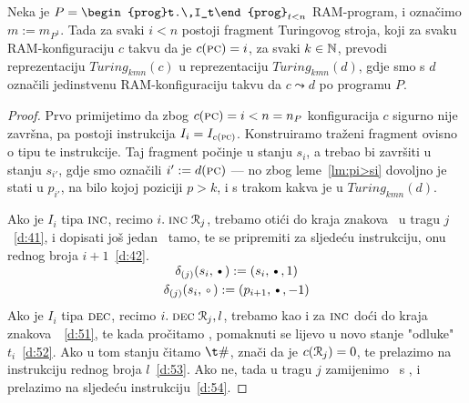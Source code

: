 \begin{propozicija}\label{prop:gadgets}
Neka je $P=\begin{prog}t.\,I_t\end{prog}_{t<n}$ RAM-program, i označimo $m:=m_{P^1}$. Tada za svaki $i<n$ postoji fragment Turingovog stroja, koji za svaku RAM-konfiguraciju $c$ takvu da je $c(\textsc{pc})=i$, za svaki $k\in{\mathbb N}$, prevodi reprezentaciju $Turing_{kmn}(c)$ u reprezentaciju $Turing_{kmn}(d)$, gdje smo s $d$ označili jedinstvenu RAM-konfiguraciju takvu da $c\leadsto d$ po programu $P$.
\end{propozicija}
\begin{proof}
Prvo primijetimo da zbog $c(\textsc{pc})=i<n=n_P$ konfiguracija $c$ sigurno nije završna, pa postoji instrukcija $I_i=I_{c(\textsc{pc})}$. Konstruiramo traženi fragment ovisno o tipu te instrukcije. Taj fragment počinje u stanju $s_i$, a trebao bi završiti u stanju $s_{i'}$, gdje smo označili $i':=d(\textsc{pc})$ --- no zbog leme~\ref{lm:pi>si} dovoljno je stati u $p_{i'}$, na bilo kojoj poziciji $p>k$, i s trakom kakva je u $Turing_{kmn}(d)$.

Ako je $I_i$ tipa $\textsc{inc}$, recimo  $i.\;\textsc{inc}\;\mathcal R_{j}$, trebamo otići do kraja znakova \textbullet\ u tragu $j$~\eqref{d:41}, i dopisati još jedan \textbullet\ tamo, te se pripremiti za sljedeću instrukciju, onu rednog broja $i+1$~\eqref{d:42}.

\noindent\begin{gather}
\SwapAboveDisplaySkip
\label{d:41}
    \delta_{(j)}(s_i,\text\textbullet):=(s_i,\text\textbullet,1)\\
\label{d:42}
    \delta_{(j)}(s_i,\text\textopenbullet):=(p_{i+1},\text\textbullet,-1)
\end{gather}
Ako je $I_i$ tipa $\textsc{dec}$, recimo $i.\;\textsc{dec}\;\mathcal R_{j},l$, trebamo kao i za $\textsc{inc}$ doći do kraja znakova~\textbullet~\eqref{d:51}, te kada pročitamo \textopenbullet, pomaknuti se lijevo u novo stanje "odluke" $t_i$~\eqref{d:52}. Ako u tom stanju čitamo $\t\#$, znači da je $c(\mathcal R_{j})=0$, te prelazimo na instrukciju rednog broja $l$~\eqref{d:53}. Ako ne, tada u tragu $j$ zamijenimo \textbullet\ s \textopenbullet, i prelazimo na sljedeću instrukciju~\eqref{d:54}.


\end{proof}
